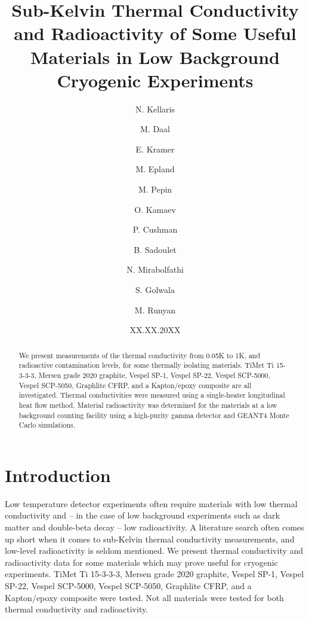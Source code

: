 \documentclass[final]{svjour2}
\begin{document}
\newcommand{\hdblarrow}{H\makebox[0.9ex][l]{$\downdownarrows$}-}
\title{Sub-Kelvin Thermal Conductivity and Radioactivity of Some Useful Materials in Low Background Cryogenic Experiments}

\author{N. Kellaris \and M. Daal \and E. Kramer \and M. Epland \and M. Pepin \and O. Kamaev \and P. Cushman \and B. Sadoulet \and N. Mirabolfathi \and S. Golwala \and M. Runyan}


\date{XX.XX.20XX}

\maketitle


\begin{abstract}
     We present measurements of the thermal conductivity from 0.05K to 1K, and radioactive contamination levels, for some thermally isolating materials. TiMet Ti 15-3-3-3, Mersen grade 2020 graphite, Vespel SP-1, Vespel SP-22, Vespel SCP-5000, Vespel SCP-5050, Graphlite CFRP, and a Kapton/epoxy composite are all investigated. Thermal conductivities were measured using a single-heater longitudinal heat flow method. Material radioactivity was determined for the materials at a low background counting facility using a high-purity gamma detector and GEANT4 Monte Carlo simulations.



\end{abstract}

\section{Introduction}
Low temperature detector experiments often require materials with low thermal conductivity and -- in the case of low background experiments such as dark matter and double-beta decay -- low radioactivity. A literature search often comes up short when it comes to sub-Kelvin thermal conductivity measurements, and low-level radioactivity is seldom mentioned. We present thermal conductivity and radioactivity data for some materials which may prove useful for cryogenic experiments. TiMet Ti 15-3-3-3, Mersen grade 2020 graphite, Vespel SP-1, Vespel SP-22, Vespel SCP-5000, Vespel SCP-5050, Graphlite CFRP, and a Kapton/epoxy composite were tested. Not all materials were tested for both thermal conductivity and radioactivity.
\end{document}
